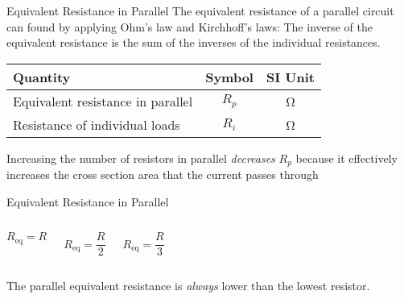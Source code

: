\documentclass[12pt,aspectratio=169]{beamer}
\begin{document}
\begin{frame}{Equivalent Resistance in Parallel}
  The equivalent resistance of a parallel circuit can found by applying Ohm's
  law and Kirchhoff's laws: The inverse of the equivalent resistance is the
  sum of the inverses of the individual resistances.

  \begin{center}
    \begin{tabular}{l|c|c}
      \rowcolor{pink}
      \textbf{Quantity} & \textbf{Symbol} & \textbf{SI Unit} \\ \hline
      Equivalent resistance in parallel & $R_p $ & \si\ohm \\
      Resistance of individual loads    & $R_i $ & \si\ohm
    \end{tabular}
  \end{center}
  Increasing the number of resistors in parallel \emph{decreases} $R_p$
  because it effectively increases the cross section area that the current
  passes through
\end{frame}


\begin{frame}{Equivalent Resistance in Parallel}
  \begin{columns}[T]
    \centering
    
    \vspace{.47in}

    \vspace{.6in}$R_\text{eq}=R$
    
    \centering

    \vspace{.2in}
    
    \vspace{.27in}$R_\text{eq}=\dfrac R2$
    
    \centering

    \vspace{.1in}$R_\text{eq}=\dfrac R3$
  \end{columns}
  \vspace{.1in}The parallel equivalent resistance is \emph{always} lower than
  the lowest resistor.
\end{frame}
\end{document}

